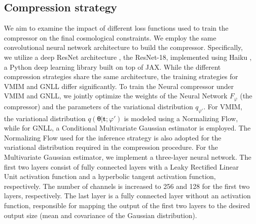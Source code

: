 \documentclass{aa}
\begin{document}
\subsection{Compression strategy}
We aim to examine the impact of different loss functions used to train the compressor on the final cosmological constraints. We employ the same convolutional neural network architecture to build the compressor. Specifically, we utilize a deep ResNet architecture \citep{he2016deep}, the ResNet-18, implemented using Haiku \citep{haiku2020github}, a Python deep learning library built on top of JAX. While the different compression strategies share the same architecture, the training strategies for VMIM and GNLL differ significantly. To train the Neural compressor under VMIM and GNLL, we jointly optimize the weights of the Neural Network $F_{\varphi}$ (the compressor) and the parameters of the variational distribution $q_{\varphi'}$. For VMIM, the variational distribution $q(\bm{\theta}|\bm{t};\varphi')$ is modeled using a Normalizing Flow, while for GNLL, a Conditional Multivariate Gaussian estimator is employed. The Normalizing Flow used for the inference strategy is also adopted for the variational distribution required in the compression procedure. For the Multivariate Gaussian estimator, we implement a three-layer neural network. The first two layers consist of fully connected layers with a Leaky Rectified Linear Unit activation function and a hyperbolic tangent activation function, respectively. The number of channels is increased to 256 and 128 for the first two layers, respectively. The last layer is a fully connected layer without an activation function, responsible for mapping the output of the first two layers to the desired output size (mean and covariance of the Gaussian distribution).
\end{document}
